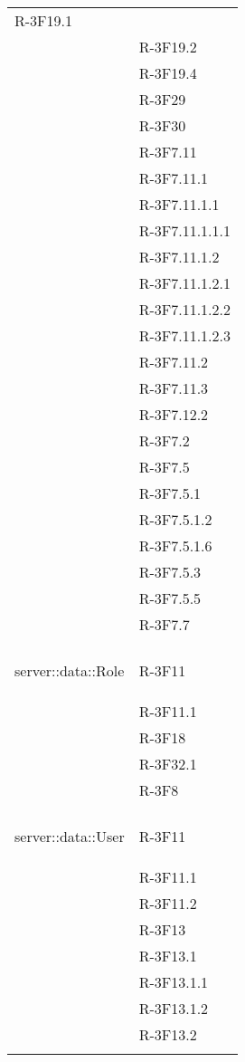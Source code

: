 \begin{longtable}{l p{3cm}}
R-3F19.1 \tabularnewline &

R-3F19.2 \tabularnewline &

R-3F19.4 \tabularnewline &

R-3F29 \tabularnewline &

R-3F30 \tabularnewline &

R-3F7.11 \tabularnewline &

R-3F7.11.1 \tabularnewline &

R-3F7.11.1.1 \tabularnewline &

R-3F7.11.1.1.1 \tabularnewline &

R-3F7.11.1.2 \tabularnewline &

R-3F7.11.1.2.1 \tabularnewline &

R-3F7.11.1.2.2 \tabularnewline &

R-3F7.11.1.2.3 \tabularnewline &

R-3F7.11.2 \tabularnewline &

R-3F7.11.3 \tabularnewline &

R-3F7.12.2 \tabularnewline &

R-3F7.2 \tabularnewline &

R-3F7.5 \tabularnewline &

R-3F7.5.1 \tabularnewline &

R-3F7.5.1.2 \tabularnewline &

R-3F7.5.1.6 \tabularnewline &

R-3F7.5.3 \tabularnewline &

R-3F7.5.5 \tabularnewline &

R-3F7.7 \tabularnewline &\tabularnewline
\midrule
\hypertarget{server::data::Role}{server::data::Role} & R-3F11 \tabularnewline &

R-3F11.1 \tabularnewline &

R-3F18 \tabularnewline &

R-3F32.1 \tabularnewline &

R-3F8 \tabularnewline &\tabularnewline
\midrule
\hypertarget{server::data::User}{server::data::User} & R-3F11 \tabularnewline &

R-3F11.1 \tabularnewline &

R-3F11.2 \tabularnewline &

R-3F13 \tabularnewline &

R-3F13.1 \tabularnewline &

R-3F13.1.1 \tabularnewline &

R-3F13.1.2 \tabularnewline &

R-3F13.2 \tabularnewline &


\end{longtable}
